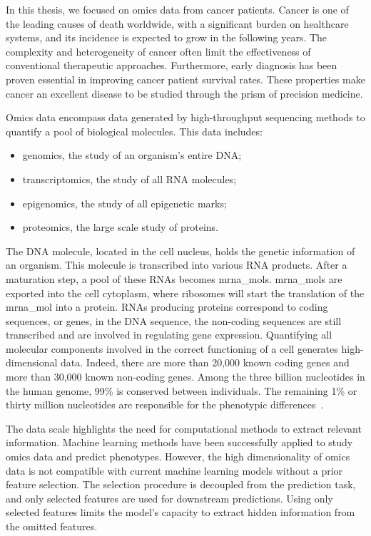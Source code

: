 \documentclass[../main.tex]{subfiles}
\begin{document}
	In this thesis, we focused on omics data from cancer patients.
	Cancer is one of the leading causes of death worldwide, with a significant burden on healthcare systems, and its incidence is expected to grow in the following years.
	The complexity and heterogeneity of cancer often limit the effectiveness of conventional therapeutic approaches.
	Furthermore, early diagnosis has been proven essential in improving cancer patient survival rates.
	These properties make cancer an excellent disease to be studied through the prism of precision medicine.

	Omics data encompass data generated by high-throughput sequencing methods to quantify a pool of biological molecules.
	This data includes:
	\begin{itemize}[nosep]
		\item genomics, the study of an organism's entire DNA\@;
		\item transcriptomics, the study of all RNA molecules;
		\item epigenomics, the study of all epigenetic marks;
		\item proteomics, the large scale study of proteins.
	\end{itemize}
	The DNA molecule, located in the cell nucleus, holds the genetic information of an organism.
	This molecule is transcribed into various RNA products.
	After a maturation step, a pool of these RNAs becomes \glspl{mrna_mol}.
	\glspl{mrna_mol} are exported into the cell cytoplasm, where ribosomes will start the translation of the \gls{mrna_mol} into a protein.
	RNAs producing proteins correspond to coding sequences, or genes,  in the DNA sequence, the non-coding sequences are still transcribed and are involved in regulating gene expression.
	Quantifying all molecular components involved in the correct functioning of a cell generates high-dimensional data.
	Indeed, there are more than 20,000 known coding genes and more than 30,000 known non-coding genes.
	Among the three billion nucleotides in the human genome, 99\% is conserved between individuals.
	The remaining 1\% or thirty million nucleotides are responsible for the phenotypic differences~\cite{GeneticVariation}.

	The data scale highlights the need for computational methods to extract relevant information.
	Machine learning methods have been successfully applied to study omics data and predict phenotypes.
	However, the high dimensionality of omics data is not compatible with current machine learning models without a prior feature selection.
	The selection procedure is decoupled from the prediction task, and only selected features are used for downstream predictions.
	Using only selected features limits the model's capacity to extract hidden information from the omitted features.
\end{document}
